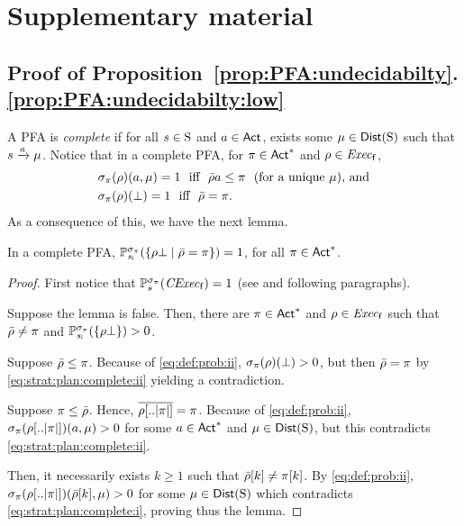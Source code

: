 
\section{Supplementary material}


\subsection{Proof of Proposition~\ref{prop:PFA:undecidabilty}.\ref{prop:PFA:undecidabilty:low}}\label{proof:prop:PFA:undecidabilty:low}

A PFA is \emph{complete} if for all $s\in\S$ and $a\in\Act$, exists
some $\mu\in\Dist(\S)$ such that $s\reach{a}\mu$.
%
Notice that in a complete PFA, for $\plan\in\Act^*$ and
$\rho\in\execf$,
\begin{align}
  &\strat_\plan(\rho)(a,\mu)=1 \text{ \ iff \ } \bar{\rho}a\leq\plan \text{ \ (for a unique } \mu \text{), and} \label{eq:strat:plan:complete:i}\\
  &\strat_\plan(\rho)(\complete)=1 \text{ \ iff \ } \bar{\rho}=\plan. \label{eq:strat:plan:complete:ii}
\end{align}
%
As a consequence of this, we have the next lemma.

\begin{lemma}\label{lm:strat:plan:complete}
  In a complete PFA,
  $\Prob_{\sini}^{\strat_\plan}(\{{\rho\complete}\mid{\bar{\rho}=\plan}\})=1$,
  for all $\plan\in\Act^*$.
\end{lemma}
%
\begin{proof}
  First notice that $\Prob^{\strat_\plan}_s(\cexecf)=1$ (see
   and following paragraphs).
  
  Suppose the lemma is false.  Then, there are $\plan\in\Act^*$ and
  $\rho\in\execf$ such that $\bar{\rho}\neq\plan$ and
  $\Prob_{\sini}^{\strat_\plan}(\{\rho\complete\})>0$.

  Suppose $\bar{\rho}\leq\plan$. Because of \cref{eq:def:prob:ii},
  $\strat_\plan(\rho)(\complete)> 0$, but then $\bar{\rho}=\plan$
  by \cref{eq:strat:plan:complete:ii} yielding a contradiction.

  Suppose $\plan\leq\bar{\rho}$. Hence,
  $\overline{\rho[..\size{\plan}]}=\plan$.  Because of
  \cref{eq:def:prob:ii}, $\strat_\plan(\rho[..\size{\plan}])(a,\mu)>0$
  for some $a\in\Act^*$ and $\mu\in\Dist(\S)$, but this contradicts
  \cref{eq:strat:plan:complete:ii}.

  Then, it necessarily exists $k\geq1$ such that
  $\bar{\rho}[k]\neq\plan[k]$.  By \cref{eq:def:prob:ii},
  $\strat_\plan(\rho[..\size{\plan}])(\bar{\rho}[k],\mu)>0$ for some
  $\mu\in\Dist(\S)$ which contradicts \cref{eq:strat:plan:complete:i},
  proving thus the lemma.
\end{proof}

